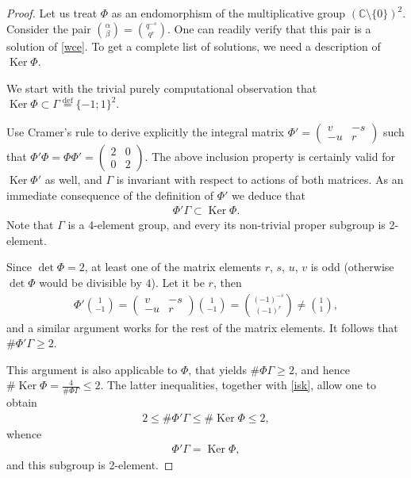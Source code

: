 \documentclass[pdftex]{sigma}
\numberwithin{equation}{section}
\begin{document}
\begin{proof} Let us treat $\Phi$ as an endomorphism of the multiplicative group $(\mathbb{C}{\setminus}\{0\})^2$. Consider the pair $\binom{\alpha}{\beta}=\binom{q^{-s}}{q^r}$. One can readily verify that this pair is a solution of \eqref{wce}. To get a complete list of solutions, we need a description of $\operatorname{Ker}\Phi$.

We start with the trivial purely computational observation that $\operatorname{Ker}\Phi\subset \Gamma\stackrel{\operatorname{def}}{=}\{-1;1\}^2$.

Use Cramer's rule to derive explicitly the integral matrix $\Phi'=\left(\begin{smallmatrix}v & -s\\ -u & r\end{smallmatrix}\right)$ such that $\Phi'\Phi=\Phi\Phi'=\left(\begin{smallmatrix}2 & 0\\ 0 & 2\end{smallmatrix}\right)$. The above inclusion property is certainly valid for $\operatorname{Ker}\Phi'$ as well, and $\Gamma$ is invariant with respect to actions of both matrices. As an immediate consequence of the definition of $\Phi'$ we deduce that
\begin{gather}\label{isk}
\Phi'\Gamma\subset\operatorname{Ker}\Phi.
\end{gather}
Note that $\Gamma$ is a 4-element group, and every its non-trivial proper subgroup is 2-element.

Since $\det\Phi=2$, at least one of the matrix elements $r$, $s$, $u$, $v$ is odd (otherwise $\det\Phi$ would be divisible by $4$). Let it be $r$, then
\begin{gather*}
\Phi'\binom{1}{-1}=\begin{pmatrix}v & -s\\ -u & r\end{pmatrix}\binom{1}{-1}=\binom{(-1)^{-s}}{(-1)^r}\ne\binom{1}{1},
\end{gather*}
and a similar argument works for the rest of the matrix elements. It follows that $\#\Phi'\Gamma\ge 2$.

This argument is also applicable to $\Phi$, that yields $\#\Phi\Gamma\ge 2$, and hence $\#\operatorname{Ker}\Phi=\frac{4}{\#\Phi\Gamma}\le 2$. The latter inequalities, together with \eqref{isk}, allow one to obtain
\begin{gather*}2\le\#\Phi'\Gamma\le\#\operatorname{Ker}\Phi\le 2,\end{gather*}
whence
\begin{gather*}\Phi'\Gamma=\operatorname{Ker}\Phi,\end{gather*}
and this subgroup is 2-element.


\end{proof}
\end{document}
